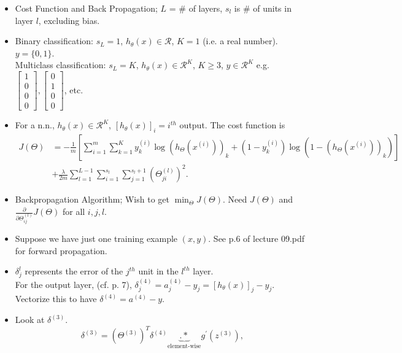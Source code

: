 \documentclass[10pt]{article}
\begin{document}
\begin{itemize}
  \item Cost Function and Back Propagation; $L$ = \# of layers, $s_l$ is \# of units in layer $l$, excluding bias.
  \item Binary classification: $s_L=1$, $h_{\theta}(x) \in \mathcal{R}$, $K=1$ (i.e. a real number). $y = \{ 0,1 \}$.\\
    Multiclass classification: $s_L=K$, $h_{\theta}(x) \in \mathcal{R}^K$, $K \geq 3$, $y \in \mathcal{R}^K$ e.g. $\begin{bmatrix}1 \\ 0 \\ 0 \\ 0\end{bmatrix}, \begin{bmatrix}0 \\ 1 \\ 0 \\ 0 \end{bmatrix}$, etc.
  \item For a n.n., $h_{\theta}(x) \in \mathcal{R}^K$, $\left[ h_{\theta}(x)\right]_i = i^{th}$ output. The cost function is
    \begin{align*}
      J( \Theta ) &= -\frac{1}{m} \left[ \sum_{i=1}^m \sum_{k=1}^K y_k^{(i)} \log \left( h_{\Theta}(x^{(i)})\right)_k + (1-y_k^{(i)}) \log \left( 1 - \left( h_{\Theta}(x^{(i)}) \right)_k \right) \right] \\
      &+ \frac{\lambda}{2m} \sum_{l=1}^{L-1} \sum_{i=1}^{s_l} \sum_{j=1}^{s_l+1} \left( \Theta_{ji}^{(l)} \right)^2.
    \end{align*}
  \item Backpropagation Algorithm; Wish to get $\min_{\Theta}J(\Theta)$. Need $J(\Theta)$ and $\frac{\partial}{\partial \Theta_{ij}^{(l)}} J(\Theta)$ for all $i,j,l$.
  \item Suppose we have just one training example $(x,y)$. See p.6 of lecture 09.pdf for forward propagation.
  \item $\delta^{l}_j$ represents the error of the $j^{th}$ unit in the $l^{th}$ layer. \\
    For the output layer, (cf. p. 7), $\delta_j^{(4)} = a_j^{(4)} - y_j = \left[ h_{\theta}(x)\right]_j - y_j$. Vectorize this to have $\delta^{(4)} = a^{(4)} - y$. 
  \item Look at $\delta^{(3)}$.
    \begin{equation*}
      \delta^{(3)} = \left( \Theta^{(3)} \right)^T \delta^{(4)} \underbrace{.*}_{\text{element-wise}} g^{\prime} \left( z^{(3)} \right), 

\end{equation*}
\end{itemize}
\end{document}
